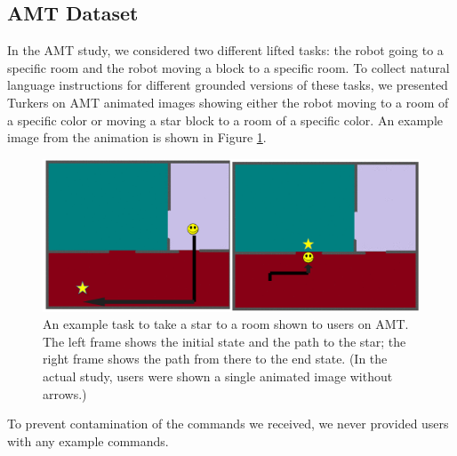 \documentclass[conference]{IEEEtran}
\begin{document}
\subsection{AMT Dataset}
In the AMT study, we considered two different lifted tasks: the robot going to a specific room and the robot moving a block to a specific room. To collect natural language instructions for different grounded versions of these tasks, we presented Turkers on AMT animated images showing either the robot moving to a room of a specific color or moving a star block to a room of a specific color. An example image from the animation is shown in Figure \ref{fig:animation}.
\begin{figure}[tp]
\begin{center}
\includegraphics[width=\columnwidth]{images/map1_2a}
\caption{An example task to take a star to a room shown to users on AMT. The left frame shows the initial state and the path to the star; the right frame shows the path from there to the end state. (In the actual study, users were shown a single animated image without arrows.)}
\label{fig:animation}
\end{center}
\end{figure}
To prevent contamination of the commands we received, we never provided users with any example commands. 
\end{document}
